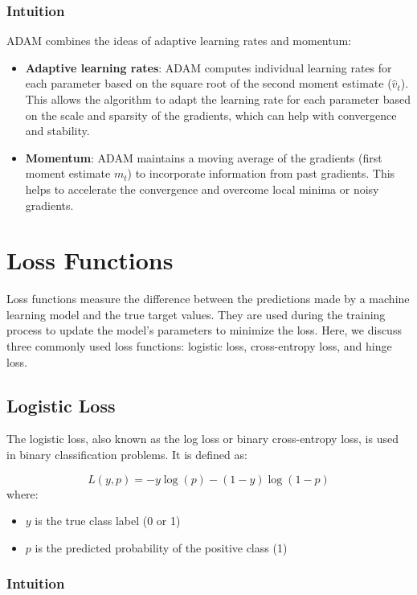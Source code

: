 \documentclass[12pt]{article}
\begin{document}
\subsubsection{Intuition}

ADAM combines the ideas of adaptive learning rates and momentum:

\begin{itemize}
\item \textbf{Adaptive learning rates}: ADAM computes individual learning rates for each parameter based on the square root of the second moment estimate ($\hat{v}_t$). This allows the algorithm to adapt the learning rate for each parameter based on the scale and sparsity of the gradients, which can help with convergence and stability.
\item \textbf{Momentum}: ADAM maintains a moving average of the gradients (first moment estimate $m_t$) to incorporate information from past gradients. This helps to accelerate the convergence and overcome local minima or noisy gradients.
\end{itemize}

\section{Loss Functions}

Loss functions measure the difference between the predictions made by a machine learning model and the true target values. They are used during the training process to update the model's parameters to minimize the loss. Here, we discuss three commonly used loss functions: logistic loss, cross-entropy loss, and hinge loss.

\subsection{Logistic Loss}

The logistic loss, also known as the log loss or binary cross-entropy loss, is used in binary classification problems. It is defined as:

$$L(y, p) = -y \log(p) - (1 - y) \log(1 - p)$$
where:
\begin{itemize}
\item $y$ is the true class label (0 or 1)
\item $p$ is the predicted probability of the positive class (1)
\end{itemize}

\subsubsection{Intuition}
\end{document}
